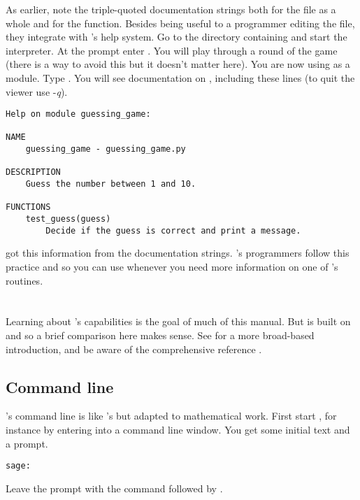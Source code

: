 As earlier, note the triple-quoted documentation strings both for the 
file as a whole and for the function.
Besides being useful to a programmer editing the file, 
they integrate with \python's help system. 
Go to the directory containing  and start 
the \python{} interpreter.
At the \inlinecode{>>>} prompt enter .
You will play through a round of the game (there is a way to avoid this
but it doesn't matter here).
You are now using  as a module.
Type
.
You will see documentation on , 
including these lines
(to quit the viewer use -\textit{q}).
\begin{lstlisting}
Help on module guessing_game:

NAME
    guessing_game - guessing_game.py

DESCRIPTION
    Guess the number between 1 and 10.

FUNCTIONS
    test_guess(guess)
        Decide if the guess is correct and print a message.
\end{lstlisting}
\python{} got this information from the documentation strings.
\Sage's programmers follow this practice and so 
you can use  
whenever you need more information on one of 
\Sage's routines.





\section{\Sage}
Learning about \Sage's capabilities is the goal of much of this manual.
But \Sage{} is built on \python{} and so a brief comparison here makes sense.
See \citep{SageTeam19} for a more broad-based introduction, and 
be aware of the comprehensive reference \citep{SageTeam19ref}.



\subsection{Command line}
\Sage's command line is like \python's but adapted to 
mathematical work.
First start \Sage,
for instance by entering  into a command line window.
You get some initial text and a prompt.
\begin{lstlisting}[style=python]
sage:  
\end{lstlisting}
Leave the prompt with the command 
followed by .

